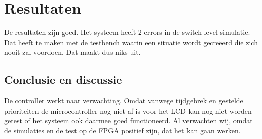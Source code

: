 \section{Resultaten}
De resultaten zijn goed. Het systeem heeft 2 errors in de switch level simulatie. Dat heeft te maken met de testbench waarin een situatie wordt gecre\"eerd die zich nooit zal voordoen. Dat maakt dus niks uit.

\subsection{Conclusie en discussie}
De controller werkt naar verwachting. Omdat vanwege tijdgebrek en gestelde prioriteiten de microcontroller nog niet af is voor het LCD kan nog niet worden getest of het systeem ook daarmee goed functioneerd. Al verwachten wij, omdat de simulaties en de test op de FPGA positief zijn, dat het kan gaan werken.\\
